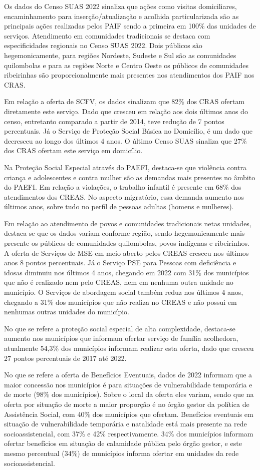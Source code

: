 \documentclass[
  letterpaper,
  DIV=11,
  numbers=noendperiod]{scrreprt}
\begin{document}
Os dados do Censo SUAS 2022 sinaliza que ações como visitas
domiciliares, encaminhamento para inserção/atualização e acolhida
particularizada são as principais ações realizadas pelos PAIF sendo a
primeira em 100\% das unidades de serviços. Atendimento em comunidades
tradicionais se destaca com especificidades regionais no Censo SUAS
2022. Dois públicos são hegemonicamente, para regiões Nordeste, Sudeste
e Sul são as comunidades quilombolas e para as regiões Norte e Centro
Oeste os públicos de comunidades ribeirinhas são proporcionalmente mais
presentes nos atendimentos dos PAIF nos CRAS.

Em relação a oferta de SCFV, os dados sinalizam que 82\% dos CRAS
ofertam diretamente este serviço. Dado que cresceu em relação aos dois
últimos anos do censo, entretanto comparado a partir de 2014, teve
redução de 7 pontos percentuais. Já o Serviço de Proteção Social Básica
no Domicílio, é um dado que decresceu ao longo dos últimos 4 anos. O
último Censo SUAS sinaliza que 27\% dos CRAS ofertam este serviço em
domicílio.

Na Proteção Social Especial através do PAEFI, destaca-se que violência
contra criança e adolescentes e contra mulher são as demandas mais
presentes no âmbito do PAEFI. Em relação a violações, o trabalho
infantil é presente em 68\% dos atendimentos dos CREAS. No aspecto
migratório, essa demanda aumento nos últimos anos, sobre tudo no perfil
de pessoas adultas (homens e mulheres).

Em relação ao atendimento de povos e comunidades tradicionais netas
unidades, destaca-se que os dados variam conforme região, sendo
hegemonicamente mais presente os públicos de comunidades quilombolas,
povos indígenas e ribeirinhos. A oferta de Serviços de MSE em meio
aberto pelos CREAS cresceu nos últimos anos 8 pontos percentuais. Já o
Serviço PSE para Pessoas com deficiência e idosas diminuiu nos últimos 4
anos, chegando em 2022 com 31\% dos municípios que não é realizado nem
pelo CREAS, nem em nenhuma outra unidade no município. O Serviços de
abordagem social também reduz nos últimos 4 anos, chegando a 31\% dos
municípios que não realiza no CREAS e não possui em nenhumas outras
unidades do município.

No que se refere a proteção social especial de alta complexidade,
destaca-se aumento nos municípios que informam ofertar serviço de
família acolhedora, atualmente 54,3\% dos municípios informam realizar
esta oferta, dado que cresceu 27 pontos percentuais de 2017 até 2022.

No que se refere a oferta de Benefícios Eventuais, dados de 2022
informam que a maior concessão nos municípios é para situações de
vulnerabilidade temporária e de morte (98\% dos municípios). Sobre o
local da oferta eles variam, sendo que na oferta por situação de morte a
maior proporção é no órgão gestor da política de Assistência Social, com
40\% dos municípios que ofertam. Benefícios eventuais em situação de
vulnerabilidade temporária e natalidade está mais presente na rede
socioassistencial, com 37\% e 42\% respectivamente. 34\% dos municípios
informam ofertar benefícios em situação de calamidade pública pelo órgão
gestor, e este mesmo percentual (34\%) de municípios informa ofertar em
unidades da rede socioassistencial.
\end{document}
